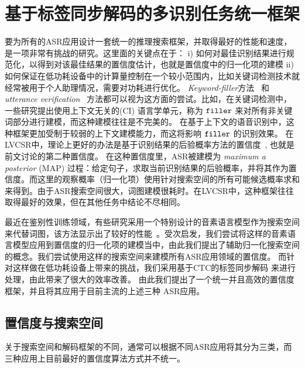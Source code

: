 \section{基于标签同步解码的多识别任务统一框架}
\label{chap:unify-framework}

要为所有的ASR应用设计一套统一的推理搜索框架，并取得最好的性能和速度，是一项非常有挑战的研究。这里面的关键点在于： i) 如何对最佳识别结果进行规范化，以得到对该最佳结果的置信度估计，也就是置信度中的归一化项的建模
    ii) 如何保证在低功耗设备中的计算量控制在一个较小范围内，比如关键词检测技术就经常被用于个人助理情况，需要对功耗进行优化。
    {\em Keyword-filler}方法~\cite{young1994detecting} 和 {\em utterance verification}~\cite{rose1995training} 方法都可以视为这方面的尝试。比如，在关键词检测中，一些研究提出使用上下文无关的(CI) 语言学单元，称为 $\tt filler$ 来对所有非关键词部分进行建模，而这种建模往往是不完美的。
    在基于上下文的语音识别中，这种框架更加受制于较弱的上下文建模能力，而这将影响 $\tt filler$ 的识别效果。
    在LVCSR中，理论上更好的办法是基于识别结果的后验概率方法的置信度~\cite{wessel2001confidence}, 也就是前文讨论的第二种置信度。 在这种置信度里，ASR被建模为  {\em maximum a posterior} (MAP) 过程：给定句子，求取当前识别结果的后验概率，并将其作为置信度。而这里的观察概率（归一化项）使用针对搜索空间的所有可能候选概率求和来得到。由于ASR搜索空间很大，词图建模很耗时。在LVCSR中，这种框架往往取得最好的效果，但在其他任务中结论不尽相同。

    最近在鉴别性训练领域，有些研究采用一个特别设计的音素语言模型作为搜索空间来代替词图，该方法显示出了较好的性能~\cite{chen2006advances}\cite{povey2016purely}。受次启发，我们尝试将这样的音素语言模型应用到置信度的归一化项的建模当中，由此我们提出了辅助归一化搜索空间的概念。我们尝试使用这样的搜索空间来建模所有ASR应用领域的置信度。 %
    而针对这样做在低功耗设备上带来的挑战，我们采用基于CTC的标签同步解码\cite{Chen+2016} 来进行处理，由此带来了很大的效率改善。
    由此我们提出了一个统一并且高效的置信度框架，并且将其应用于目前主流的上述三种 ASR应用。

  \subsection{置信度与搜索空间}
  \label{Sec:conf-search-space}

  关于搜索空间和解码框架的不同，通常可以根据不同ASR应用将其分为三类，而三种应用上目前最好的置信度算法方式并不统一。

